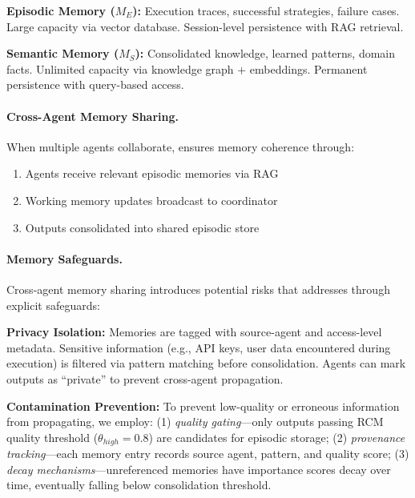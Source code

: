 \documentclass{article}
\theoremstyle{plain}
\theoremstyle{definition}
\theoremstyle{remark}
\begin{document}
\textbf{Episodic Memory ($M_E$):} Execution traces, successful strategies, failure cases. Large capacity via vector database. Session-level persistence with RAG retrieval.

\textbf{Semantic Memory ($M_S$):} Consolidated knowledge, learned patterns, domain facts. Unlimited capacity via knowledge graph + embeddings. Permanent persistence with query-based access.

\paragraph{Cross-Agent Memory Sharing.}

When multiple agents collaborate, \uma{} ensures memory coherence through:
\begin{enumerate}[nosep,leftmargin=*]
	\item Agents receive relevant episodic memories via RAG
	\item Working memory updates broadcast to coordinator
	\item Outputs consolidated into shared episodic store
\end{enumerate}

\paragraph{Memory Safeguards.}
Cross-agent memory sharing introduces potential risks that \uma{} addresses through explicit safeguards:

\textbf{Privacy Isolation:} Memories are tagged with source-agent and access-level metadata. Sensitive information (e.g., API keys, user data encountered during execution) is filtered via pattern matching before consolidation. Agents can mark outputs as ``private'' to prevent cross-agent propagation.

\textbf{Contamination Prevention:} To prevent low-quality or erroneous information from propagating, we employ: (1) \textit{quality gating}---only outputs passing RCM quality threshold ($\theta_{high} = 0.8$) are candidates for episodic storage; (2) \textit{provenance tracking}---each memory entry records source agent, pattern, and quality score; (3) \textit{decay mechanisms}---unreferenced memories have importance scores decay over time, eventually falling below consolidation threshold.
\end{document}
